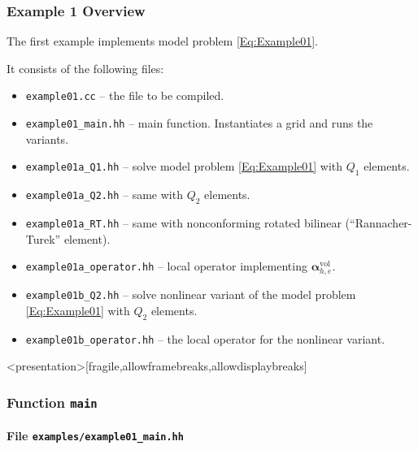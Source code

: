 \begin{frame}
\frametitle{Example 1 Overview}
The first example implements model problem \eqref{Eq:Example01}.

It consists of the following files:
\begin{itemize}
\item \lstinline{example01.cc} -- the file to be compiled. 
\item \lstinline{example01_main.hh} -- main function. Instantiates a grid and runs the variants.
\item \lstinline{example01a_Q1.hh} -- solve model problem \eqref{Eq:Example01} with $Q_1$ elements.
\item \lstinline{example01a_Q2.hh} -- same with $Q_2$ elements.
\item \lstinline{example01a_RT.hh} -- same with nonconforming rotated bilinear (``Rannacher-Turek'' element).
\item \lstinline{example01a_operator.hh} -- local operator implementing $\bm{\alpha}_{h,e}^{\text{vol}}$.
\item \lstinline{example01b_Q2.hh} -- solve nonlinear variant of the model problem \eqref{Eq:Example01} with $Q_2$ elements.
\item \lstinline{example01b_operator.hh} -- the local operator for the nonlinear variant.
\end{itemize}
\end{frame}

\begin{frame}<presentation>[fragile,allowframebreaks,allowdisplaybreaks]
\frametitle<presentation>{Function \lstinline{main}}
\framesubtitle<presentation>{File \texttt{examples/example01\_main.hh}}

\end{frame}


